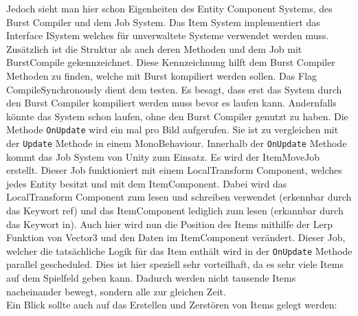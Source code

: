 \documentclass[12pt, titlepage]{article}
\DeclareRobustCommand{\#}{\adjustbox{valign=B,totalheight=.57\baselineskip}{\oldhash}}%
\begin{document}
Jedoch sieht man hier schon Eigenheiten des Entity Component Systems, des Burst Compiler und dem Job System. Das Item System implementiert das Interface ISystem welches für unverwaltete Systeme verwendet werden muss. Zusätzlich ist die Struktur als auch deren Methoden und dem Job mit BurstCompile gekennzeichnet. Diese Kennzeichnung hilft dem Burst Compiler Methoden zu finden, welche mit Burst kompiliert werden sollen. Das Flag CompileSynchronously dient dem testen. Es besagt, dass erst das System durch den Burst Compiler kompiliert werden muss bevor es laufen kann. Andernfalls könnte das System schon laufen, ohne den Burst Compiler genutzt zu haben. Die Methode \texttt{OnUpdate} wird ein mal pro Bild aufgerufen. Sie ist zu vergleichen mit der \texttt{Update} Methode in einem MonoBehaviour. Innerhalb der \texttt{OnUpdate} Methode kommt das Job System von Unity zum Einsatz. Es wird der ItemMoveJob erstellt. Dieser Job funktioniert mit einem LocalTransform Component, welches jedes Entity besitzt und mit dem ItemComponent. Dabei wird das LocalTransform Component zum lesen und schreiben verwendet (erkennbar durch das Keywort ref) und das ItemComponent lediglich zum lesen (erkannbar durch das Keywort in). Auch hier wird nun die Position des Items mithilfe der Lerp Funktion von Vector3 und den Daten im ItemComponent verändert. Dieser Job, welcher die tatsächliche Logik für das Item enthält wird in der \texttt{OnUpdate} Methode parallel gescheduled. Dies ist hier speziell sehr vorteilhaft, da es sehr viele Items auf dem Spielfeld geben kann. Dadurch werden nicht tausende Items nacheinander bewegt, sondern alle zur gleichen Zeit.\\Ein Blick sollte auch auf das Erstellen und Zerstören von Items gelegt werden:
\end{document}
